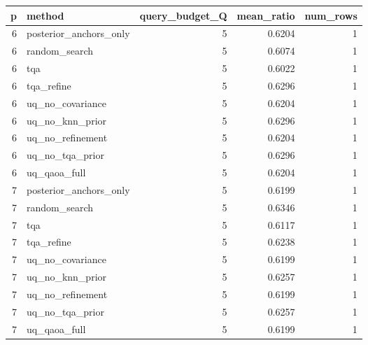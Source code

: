 \begin{tabular}{rlrrr}
\toprule
p & method & query_budget_Q & mean_ratio & num_rows \\
\midrule
6 & posterior_anchors_only & 5 & 0.6204 & 1 \\
6 & random_search & 5 & 0.6074 & 1 \\
6 & tqa & 5 & 0.6022 & 1 \\
6 & tqa_refine & 5 & 0.6296 & 1 \\
6 & uq_no_covariance & 5 & 0.6204 & 1 \\
6 & uq_no_knn_prior & 5 & 0.6296 & 1 \\
6 & uq_no_refinement & 5 & 0.6204 & 1 \\
6 & uq_no_tqa_prior & 5 & 0.6296 & 1 \\
6 & uq_qaoa_full & 5 & 0.6204 & 1 \\
7 & posterior_anchors_only & 5 & 0.6199 & 1 \\
7 & random_search & 5 & 0.6346 & 1 \\
7 & tqa & 5 & 0.6117 & 1 \\
7 & tqa_refine & 5 & 0.6238 & 1 \\
7 & uq_no_covariance & 5 & 0.6199 & 1 \\
7 & uq_no_knn_prior & 5 & 0.6257 & 1 \\
7 & uq_no_refinement & 5 & 0.6199 & 1 \\
7 & uq_no_tqa_prior & 5 & 0.6257 & 1 \\
7 & uq_qaoa_full & 5 & 0.6199 & 1 \\
\bottomrule
\end{tabular}
